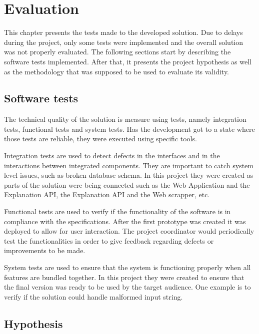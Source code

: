 
\chapter{Evaluation} %
\label{chap:Chapter6}

This chapter presents the tests made to the developed solution.
Due to delays during the project, only some tests were implemented and the overall solution was not properly evaluated.
The following sections start by describing the software tests implemented.
After that, it presents the project hypothesis as well as the methodology that was supposed to be used to evaluate its validity.

\section{Software tests}

The technical quality of the solution is measure using tests, namely integration tests, functional tests and system tests.
Has the development got to a state where those tests are reliable, they were executed using specific tools.

Integration tests are used to detect defects in the interfaces and in the interactions between integrated components.
They are important to catch system level issues, such as broken database schema.
In this project they were created as parts of the solution were being connected such as the Web Application and the Explanation API, the Explanation API and the Web scrapper, etc.

Functional tests are used to verify if the functionality of the software is in compliance with the specifications.
After the first prototype was created it was deployed to allow for user interaction.
The project coordinator would periodically test the functionalities in order to give feedback regarding defects or improvements to be made.

System tests are used to ensure that the system is functioning properly when all features are bundled together.
In this project they were created to ensure that the final version was ready to be used by the target audience.
One example is to verify if the solution could handle malformed input string.

\section{Hypothesis}

